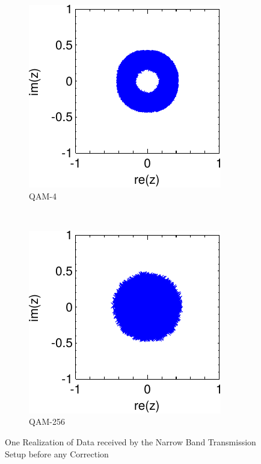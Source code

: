 \begin{figure}[p]
  \centering
  \begin{subfigure}{0.45\textwidth}
    \centering
    \includegraphics[width=\textwidth]{figures/matlab/res_450_qam4_cp_rx}
    \caption{\gls{QAM}-4}
    \label{fig:res_450_qam4_cp_rx}
  \end{subfigure}
  ~
  \begin{subfigure}{0.45\textwidth}
    \centering
    \includegraphics[width=\textwidth]{figures/matlab/res_450_qam256_cp_rx}
    \caption{\gls{QAM}-256}
    \label{fig:res_450_qam256_cp_rx}
  \end{subfigure}
  \caption{One Realization of Data received by the Narrow Band
    Transmission Setup before any Correction}
  \label{fig:res_450_cp_rx}
\end{figure}

